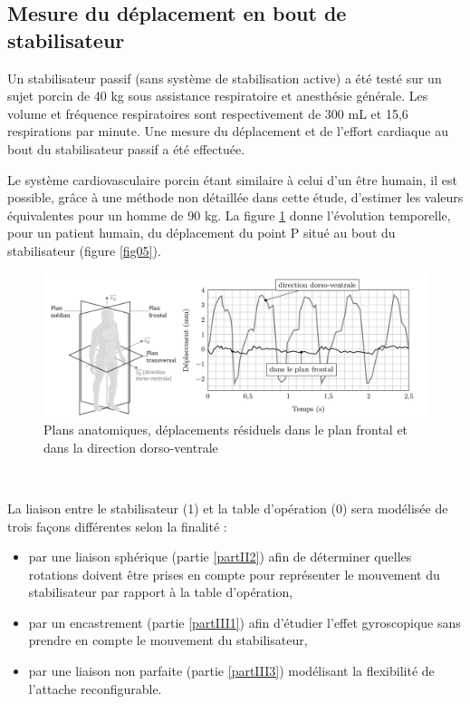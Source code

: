 \subsection{Mesure du déplacement en bout de stabilisateur}

Un stabilisateur passif (sans système de stabilisation active) a été testé sur un sujet porcin de 40 kg sous assis­tance respiratoire et anesthésie générale. Les volume et fréquence respiratoires sont respectivement de 300 mL et 15,6 respirations par minute. Une mesure du déplacement et de l'effort cardiaque au bout du stabilisateur passif a été effectuée. 

Le système cardiovasculaire porcin étant similaire à celui d'un être humain, il est possible, grâce à une méthode non détaillée dans cette étude, d'estimer les valeurs équivalentes pour un homme de 90 kg. La figure \ref{fig04} donne l'évolution temporelle, pour un patient humain, du déplacement du point P situé au bout du stabilisateur (figure \ref{fig05}).

\begin{figure}[ht]
\begin{center}
\includegraphics[width=0.9\linewidth]{img/fig04}
\caption{Plans anatomiques, déplacements résiduels dans le plan frontal et dans la direction dorso-ventrale}
\label{fig04}
\end{center}
\end{figure} 


~\

La liaison entre le stabilisateur (1) et la table d'opération (0) sera modélisée de trois façons différentes selon la finalité :
\begin{itemize}
 \item par une liaison sphérique (partie \ref{partII2}) afin de déterminer quelles rotations doivent être prises en compte pour représenter le mouvement du stabilisateur par rapport à la table d'opération, 
 \item par un encastrement (partie \ref{partIII1}) afin d'étudier l'effet gyroscopique sans prendre en compte le mouvement du stabilisateur,
 \item par une liaison non parfaite (partie \ref{partIII3}) modélisant la flexibilité de l'attache reconfigurable. 
\end{itemize}

